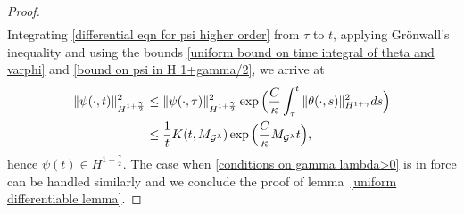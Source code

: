 \documentclass[10pt,a4paper]{amsart}
\newcommand{\Gg}{\mathcal{G}^{\lambda}}
\begin{document}
\begin{proof}
\begin{align}
\end{align}
Integrating \eqref{differential eqn for psi higher order} from $\tau$ to $t$, applying Gr\"{o}nwall's inequality and using the bounds \eqref{uniform bound on time integral of theta and varphi} and \eqref{bound on psi in H 1+gamma/2}, we arrive at
\begin{align}\label{H 1+gamma/2 bound on psi}
\|\psi(\cdot,t)\|^2_{H^{1+\frac{\gamma}{2}}}&\le \|\psi(\cdot,\tau)\|^2_{H^{1+\frac{\gamma}{2}}}\exp\Big(\frac{C}{\kappa}\int_{\tau}^t\|\theta(\cdot,s)\|^2_{H^{1+\gamma}}ds\Big)\notag\\
&\le \frac{1}{t}K(t,M_{\Gg})\exp\Big(\frac{C}{\kappa}M_{\Gg}t\Big),
\end{align}
hence $\psi(t)\in H^{1+\frac{\gamma}{2}}$. The case when \eqref{conditions on gamma lambda>0} is in force can be handled similarly and we conclude the proof of lemma~\ref{uniform differentiable lemma}.
\end{proof}
\end{document}
